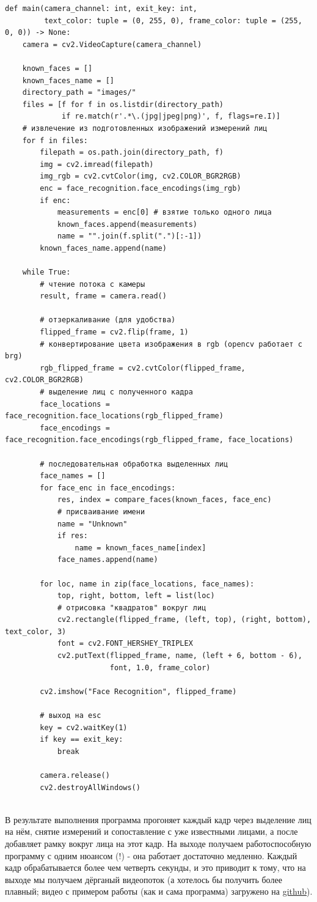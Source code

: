 \documentclass[a4paper,hidelinks,14pt]{extarticle}
\begin{document}
	\begin{verbatim}
def main(camera_channel: int, exit_key: int,
         text_color: tuple = (0, 255, 0), frame_color: tuple = (255, 0, 0)) -> None:
	camera = cv2.VideoCapture(camera_channel)

	known_faces = []
	known_faces_name = []
	directory_path = "images/"
	files = [f for f in os.listdir(directory_path)
			 if re.match(r'.*\.(jpg|jpeg|png)', f, flags=re.I)]
	# извлечение из подготовленных изображений измерений лиц
	for f in files:
		filepath = os.path.join(directory_path, f)
		img = cv2.imread(filepath)
		img_rgb = cv2.cvtColor(img, cv2.COLOR_BGR2RGB)
		enc = face_recognition.face_encodings(img_rgb)
		if enc:
			measurements = enc[0] # взятие только одного лица
			known_faces.append(measurements)
			name = "".join(f.split(".")[:-1])
		known_faces_name.append(name)

	while True:
		# чтение потока с камеры
		result, frame = camera.read()

		# отзеркаливание (для удобства)
		flipped_frame = cv2.flip(frame, 1)
		# конвертирование цвета изображения в rgb (opencv работает с brg)
		rgb_flipped_frame = cv2.cvtColor(flipped_frame, cv2.COLOR_BGR2RGB)
		# выделение лиц с полученного кадра
		face_locations = face_recognition.face_locations(rgb_flipped_frame)
		face_encodings = face_recognition.face_encodings(rgb_flipped_frame, face_locations)
	
		# последовательная обработка выделенных лиц
		face_names = []
		for face_enc in face_encodings:
			res, index = compare_faces(known_faces, face_enc)
			# присваивание имени
			name = "Unknown"
			if res:
				name = known_faces_name[index]
			face_names.append(name)

		for loc, name in zip(face_locations, face_names):
			top, right, bottom, left = list(loc)
			# отрисовка "квадратов" вокруг лиц
			cv2.rectangle(flipped_frame, (left, top), (right, bottom), text_color, 3)
			font = cv2.FONT_HERSHEY_TRIPLEX
			cv2.putText(flipped_frame, name, (left + 6, bottom - 6),
					    font, 1.0, frame_color)

		cv2.imshow("Face Recognition", flipped_frame)

		# выход на esc
		key = cv2.waitKey(1)
		if key == exit_key:
			break	
		
		camera.release()
		cv2.destroyAllWindows()
		
	\end{verbatim}
	
	В результате выполнения программа прогоняет каждый кадр через выделение лиц на нём, снятие измерений и сопоставление с уже известными лицами, а после добавляет рамку вокруг лица на этот кадр. На выходе получаем работоспособную программу с одним нюансом (!) - она работает достаточно медленно. Каждый кадр обрабатывается более чем четверть секунды, и это приводит к тому, что на выходе мы получаем дёрганый видеопоток (а хотелось бы получить более плавный; видео с примером работы (как и сама программа) загружено на \href{https://github.com/ventusjke/attendance_system/tree/main/practice_videos/basic.mkv}{github}).
	
\end{document}
